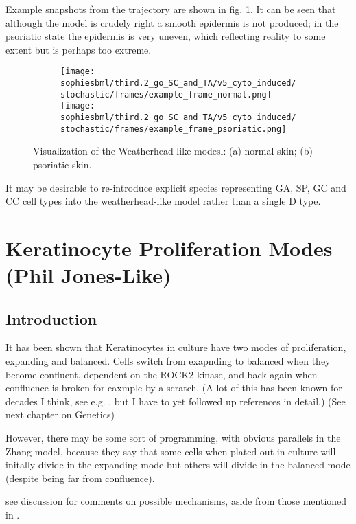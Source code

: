 \documentclass[a4paper,10pt]{report}
\newcommand{\psortbase}{/home/ngrs2/work/bsu/PSORT_Zuliani_Reynolds/}
\newcommand{\sbmlbase}{\psortbase/sbml-sh/}
\newcommand{\sophiesbml}{\sbmlbase/sophie_like}
\begin{document}
Example snapshots from the trajectory are shown in fig. \ref{fig:visu_thirdpointtwosophie_cytostim}. It can be seen that although the model is crudely right a smooth epidermis is not produced; in the psoriatic state the epidermis is very uneven, which reflecting reality to some extent but is perhaps too extreme. 


\begin{figure}[h!]
  \begin{subfigure}{\textwidth}
    \texttt{[image: \\sophiesbml/third.2\_go\_SC\_and\_TA/v5\_cyto\_induced/stochastic/frames/example\_frame\_normal.png]}
    \texttt{[image: \\sophiesbml/third.2\_go\_SC\_and\_TA/v5\_cyto\_induced/stochastic/frames/example\_frame\_psoriatic.png]}
  \end{subfigure}
  \caption{Visualization of the Weatherhead-like modesl: (a) normal skin; (b) psoriatic skin.}
  \label{fig:visu_thirdpointtwosophie_cytostim}
\end{figure}

It may be desirable to re-introduce explicit species representing GA, SP, GC and CC cell types into the weatherhead-like model rather than a single D type. 



\chapter{Keratinocyte Proliferation Modes (Phil Jones-Like)}\label{chapter-philjones}

\section{Introduction}
It has been shown \cite{roshan2016human} that Keratinocytes in culture have two modes of proliferation, expanding and balanced. Cells switch from exapnding to balanced when they become confluent, dependent on the ROCK2 kinase,  and back again when confluence is broken for eaxmple by a scratch. (A lot of this has been known for decades I think, see e.g. \cite{barrandon1987cell}, but I have to yet followed up references in detail.) (See next chapter on Genetics) 

However, there may be some sort of programming, with obvious parallels in the Zhang model, because they say that some cells when plated out in culture will initally divide in the expanding mode but others will divide in the balanced mode (despite being far from confluence).

see discussion for comments on possible mechanisms, aside from those mentioned in \cite{roshan2016human}.
\end{document}
